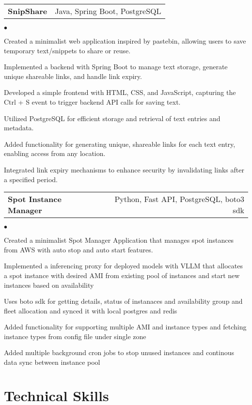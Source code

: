 \documentclass[margin, 11pt]{res}
\makeatletter
\newcommand{\resumeSubSubheading}[2]{
\begin{tabular*}{1.01\textwidth}{@{\hspace{-4pt}}l @{\extracolsep{\fill}} r}
    #1 & #2 
\end{tabular*}\vspace{-7pt}
}
\newenvironment{list2}{
	\begin{list}{$\bullet$}{%
	    \small
		\setlength{\itemsep}{0in}
		\setlength{\parsep}{0in} \setlength{\parskip}{0in}
		\setlength{\topsep}{0in} \setlength{\partopsep}{0in}
		\setlength{\leftmargin}{0.2in}}}{\end{list}}
\makeatother
\begin{document}
\begin{resume}
\resumeSubSubheading{\textbf{SnipShare}}
{Java, Spring Boot, PostgreSQL}

\begin{list2}
    \item Created a minimalist web application inspired by pastebin, allowing users to save temporary text/snippets to share or reuse.
    \item Implemented a backend with Spring Boot to manage text storage, generate unique shareable links, and handle link expiry.
    \item Developed a simple frontend with HTML, CSS, and JavaScript, capturing the Ctrl + S event to trigger backend API calls for saving text.
    \item Utilized PostgreSQL for efficient storage and retrieval of text entries and metadata.
    \item Added functionality for generating unique, shareable links for each text entry, enabling access from any location.
    \item Integrated link expiry mechanisms to enhance security by invalidating links after a specified period.
\end{list2}

\resumeSubSubheading{\textbf{Spot Instance Manager}}
{Python, Fast API, PostgreSQL, boto3 sdk}

\begin{list2}
    \item Created a minimalist Spot Manager Application that manages spot instances from AWS with auto stop and auto start features.
    \item Implemented a inferencing proxy for deployed models with VLLM that allocates a spot instance with desired AMI from existing pool of instances and start new instances based on availability
    \item Uses boto sdk for getting details, status of instanaces and availability group and fleet allocation and synced it with local postgres and redis
    \item Added functionality for supporting multiple AMI and instance types and fetching instance types from config file under single zone
    \item Added multiple background cron jobs to stop unused instances and continous data sync between instance pool
\end{list2}


\section{\sc Technical Skills}


\end{resume}
\end{document}
